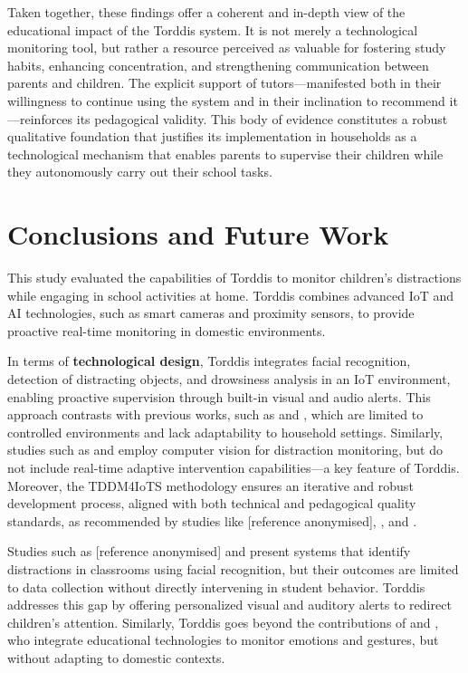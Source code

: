                 Taken together, these findings offer a coherent and in-depth view of the educational impact of the Torddis system. It is not merely a technological monitoring tool, but rather a resource perceived as valuable for fostering study habits, enhancing concentration, and strengthening communication between parents and children. The explicit support of tutors—manifested both in their willingness to continue using the system and in their inclination to recommend it—reinforces its pedagogical validity. This body of evidence constitutes a robust qualitative foundation that justifies its implementation in households as a technological mechanism that enables parents to supervise their children while they autonomously carry out their school tasks.
                
                \section{Conclusions and Future Work}
                \label{section:eight}
                This study evaluated the capabilities of Torddis to monitor children’s distractions while engaging in school activities at home. Torddis combines advanced IoT and AI technologies, such as smart cameras and proximity sensors, to provide proactive real-time monitoring in domestic environments.
                
                In terms of \textbf{technological design}, Torddis integrates facial recognition, detection of distracting objects, and drowsiness analysis in an IoT environment, enabling proactive supervision through built-in visual and audio alerts. This approach contrasts with previous works, such as \cite{Campbell2015Using} and \cite{Ucar2022Recognizing}, which are limited to controlled environments and lack adaptability to household settings. Similarly, studies such as \cite{Argel2023Intellitell} and \cite{Nguyen2019} employ computer vision for distraction monitoring, but do not include real-time adaptive intervention capabilities—a key feature of Torddis. Moreover, the TDDM4IoTS methodology ensures an iterative and robust development process, aligned with both technical and pedagogical quality standards, as recommended by studies like [reference anonymised], \cite{Hachad2020}, and \cite{Salter2014Exploring}.
                
                Studies such as [reference anonymised] and \cite{Nguyen2019} present systems that identify distractions in classrooms using facial recognition, but their outcomes are limited to data collection without directly intervening in student behavior. Torddis addresses this gap by offering personalized visual and auditory alerts to redirect children's attention. Similarly, Torddis goes beyond the contributions of \cite{Ozdamli2022} and \cite{VilliersRader2021}, who integrate educational technologies to monitor emotions and gestures, but without adapting to domestic contexts.
                
